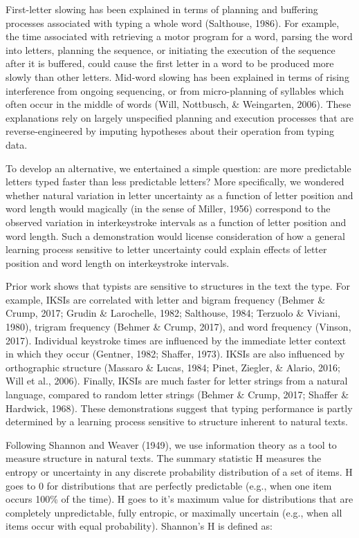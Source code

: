 \documentclass[,man,donotrepeattitle,floatsintext]{apa6}
\begin{document}
First-letter slowing has been explained in terms of planning and buffering processes associated with typing a whole word (Salthouse, 1986). For example, the time associated with retrieving a motor program for a word, parsing the word into letters, planning the sequence, or initiating the execution of the sequence after it is buffered, could cause the first letter in a word to be produced more slowly than other letters. Mid-word slowing has been explained in terms of rising interference from ongoing sequencing, or from micro-planning of syllables which often occur in the middle of words (Will, Nottbusch, \& Weingarten, 2006). These explanations rely on largely unspecified planning and execution processes that are reverse-engineered by imputing hypotheses about their operation from typing data.

To develop an alternative, we entertained a simple question: are more predictable letters typed faster than less predictable letters? More specifically, we wondered whether natural variation in letter uncertainty as a function of letter position and word length would magically (in the sense of Miller, 1956) correspond to the observed variation in interkeystroke intervals as a function of letter position and word length. Such a demonstration would license consideration of how a general learning process sensitive to letter uncertainty could explain effects of letter position and word length on interkeystroke intervals.

Prior work shows that typists are sensitive to structures in the text the type. For example, IKSIs are correlated with letter and bigram frequency (Behmer \& Crump, 2017; Grudin \& Larochelle, 1982; Salthouse, 1984; Terzuolo \& Viviani, 1980), trigram frequency (Behmer \& Crump, 2017), and word frequency (Vinson, 2017). Individual keystroke times are influenced by the immediate letter context in which they occur (Gentner, 1982; Shaffer, 1973). IKSIs are also influenced by orthographic structure (Massaro \& Lucas, 1984; Pinet, Ziegler, \& Alario, 2016; Will et al., 2006). Finally, IKSIs are much faster for letter strings from a natural language, compared to random letter strings (Behmer \& Crump, 2017; Shaffer \& Hardwick, 1968). These demonstrations suggest that typing performance is partly determined by a learning process sensitive to structure inherent to natural texts.

Following Shannon and Weaver (1949), we use information theory as a tool to measure structure in natural texts. The summary statistic H measures the entropy or uncertainty in any discrete probability distribution of a set of items. H goes to 0 for distributions that are perfectly predictable (e.g., when one item occurs 100\% of the time). H goes to it's maximum value for distributions that are completely unpredictable, fully entropic, or maximally uncertain (e.g., when all items occur with equal probability). Shannon's H is defined as:
\end{document}
